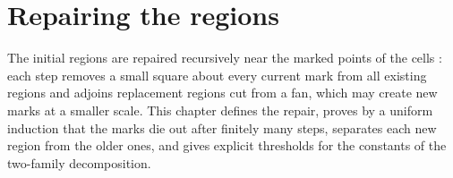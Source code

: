 \chapter{Repairing the regions}%
\label{ch:peps_area_law_repair}

The initial regions are repaired recursively near the marked points of the
cells \cite[Section~11]{OpenAI2026AreaLaw}: each step removes a small square about
every current mark from all existing regions and adjoins replacement regions
cut from a fan, which may create new marks at a smaller scale. This chapter
defines the repair, proves by a uniform induction that the marks die out after
finitely many steps, separates each new region from the older ones, and gives
explicit thresholds for the constants of the two-family decomposition.











